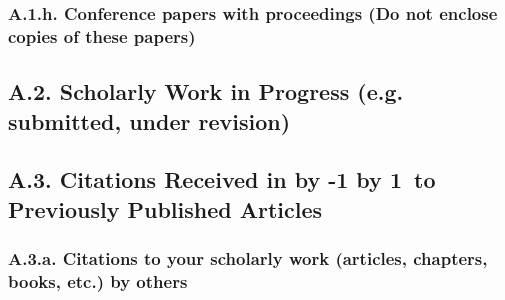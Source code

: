 \documentclass[12pt]{article}
\newcommand\LastYear{%
  \advance\year by -1 \the\year\advance\year by 1}
\begin{document}

\subsubsection*{A.1.h. Conference papers with proceedings (Do not enclose copies of these papers)}


\subsection*{A.2. Scholarly Work in Progress (e.g. submitted, under revision)}

\subsection*{A.3. Citations Received in \LastYear ~to Previously Published Articles}

\subsubsection*{A.3.a. Citations to your scholarly work (articles, chapters, books, etc.) by others}
\end{document}
